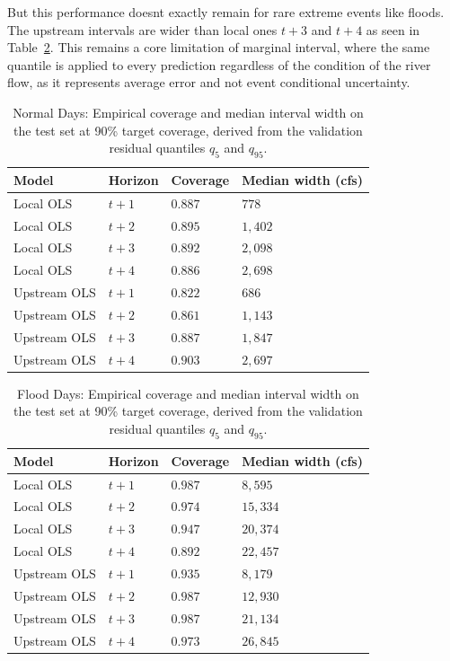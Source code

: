 \documentclass[10pt, twocolumn]{article}
\begin{document}
But this performance doesnt exactly remain for rare extreme events like floods. The upstream intervals are wider than local ones $t{+}3$ and $t{+}4$ as seen in Table~\ref{tab:intervals_flood_days}. This remains a core limitation of marginal interval, where the same quantile is applied to every prediction regardless of the condition of the river flow, as it represents average error and not event conditional uncertainty.

\begin{table}[h]
\centering
\caption{Normal Days: Empirical coverage and median interval width on the test set at 90\% target coverage, derived from the validation residual quantiles
$q_5$ and $q_{95}$.}
\label{tab:intervals_all_days}
\footnotesize
\begin{tabularx}{\columnwidth}{@{}lXXX@{}}
\toprule
\textbf{Model} & \textbf{Horizon} & \textbf{Coverage} & \textbf{Median width (cfs)} \\
\midrule
Local OLS    & $t{+}1$ & $0.887$ & $778$ \\
Local OLS    & $t{+}2$ & $0.895$ & $1{,}402$ \\
Local OLS    & $t{+}3$ & $0.892$ & $2{,}098$ \\
Local OLS    & $t{+}4$ & $0.886$ & $2{,}698$ \\
\midrule
Upstream OLS & $t{+}1$ & $0.822$ & $686$ \\
Upstream OLS & $t{+}2$ & $0.861$ & $1{,}143$ \\
Upstream OLS & $t{+}3$ & $0.887$ & $1{,}847$ \\
Upstream OLS & $t{+}4$ & $0.903$ & $2{,}697$ \\
\bottomrule
\end{tabularx}
\end{table}

\begin{table}[h]
\centering
\caption{Flood Days: Empirical coverage and median interval width on the test set at 90\% target coverage, derived from the validation residual quantiles
$q_5$ and $q_{95}$.}
\label{tab:intervals_flood_days}
\footnotesize
\begin{tabularx}{\columnwidth}{@{}lXXX@{}}
\toprule
\textbf{Model} & \textbf{Horizon} & \textbf{Coverage} & \textbf{Median width (cfs)} \\
\midrule
Local OLS    & $t{+}1$ & $0.987$ & $8{,}595$ \\
Local OLS    & $t{+}2$ & $0.974$ & $15{,}334$ \\
Local OLS    & $t{+}3$ & $0.947$ & $20{,}374$ \\
Local OLS    & $t{+}4$ & $0.892$ & $22{,}457$ \\
\midrule
Upstream OLS & $t{+}1$ & $0.935$ & $8{,}179$ \\
Upstream OLS & $t{+}2$ & $0.987$ & $12{,}930$ \\
Upstream OLS & $t{+}3$ & $0.987$ & $21{,}134$ \\
Upstream OLS & $t{+}4$ & $0.973$ & $26{,}845$ \\
\bottomrule
\end{tabularx}
\end{table}
\end{document}
